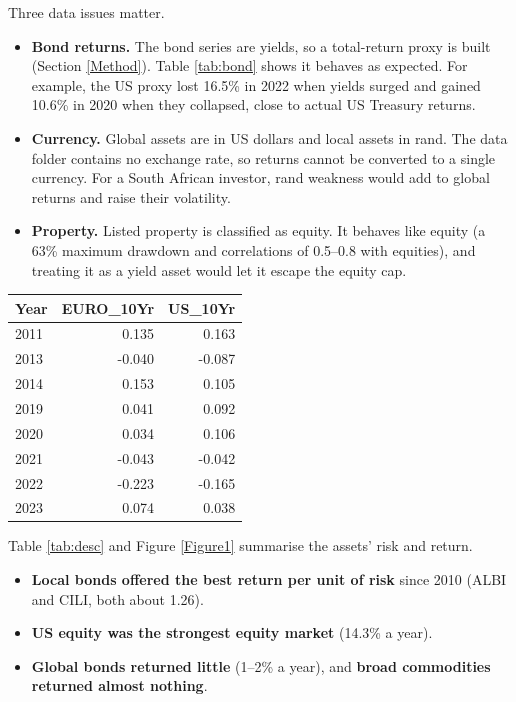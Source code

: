 \documentclass[11pt,preprint]{elsarticle}
\let\origtable\table
\let\endorigtable\endtable
\renewenvironment{table}[1][2] {
    \expandafter\origtable\expandafter[H]
} {
    \endorigtable
}
\numberwithin{equation}{section}
\numberwithin{figure}{section}
\numberwithin{table}{section}
\def\tightlist{} %
\begin{document}
Three data issues matter.

\begin{itemize}
\tightlist
\item
  \textbf{Bond returns.} The bond series are yields, so a total-return
  proxy is built (Section \ref{Method}). Table \ref{tab:bond} shows it
  behaves as expected. For example, the US proxy lost 16.5\% in 2022
  when yields surged and gained 10.6\% in 2020 when they collapsed,
  close to actual US Treasury returns.
\item
  \textbf{Currency.} Global assets are in US dollars and local assets in
  rand. The data folder contains no exchange rate, so returns cannot be
  converted to a single currency. For a South African investor, rand
  weakness would add to global returns and raise their volatility.
\item
  \textbf{Property.} Listed property is classified as equity. It behaves
  like equity (a 63\% maximum drawdown and correlations of 0.5--0.8 with
  equities), and treating it as a yield asset would let it escape the
  equity cap.
\end{itemize}

\begin{table}[!htbp]
\centering
\caption{Bond total-return proxy: calendar-year returns} 
\label{tab:bond}
\begingroup\footnotesize
\begin{tabular}{lrr}
  \hline
Year & EURO\_10Yr & US\_10Yr \\ 
  \hline
2011 & 0.135 & 0.163 \\ 
  2013 & -0.040 & -0.087 \\ 
  2014 & 0.153 & 0.105 \\ 
  2019 & 0.041 & 0.092 \\ 
  2020 & 0.034 & 0.106 \\ 
  2021 & -0.043 & -0.042 \\ 
  2022 & -0.223 & -0.165 \\ 
  2023 & 0.074 & 0.038 \\ 
   \hline
\end{tabular}
\endgroup
\end{table}

Table \ref{tab:desc} and Figure \ref{Figure1} summarise the assets' risk
and return.

\begin{itemize}
\tightlist
\item
  \textbf{Local bonds offered the best return per unit of risk} since
  2010 (ALBI and CILI, both about 1.26).
\item
  \textbf{US equity was the strongest equity market} (14.3\% a year).
\item
  \textbf{Global bonds returned little} (1--2\% a year), and
  \textbf{broad commodities returned almost nothing}.
\end{itemize}
\end{document}
